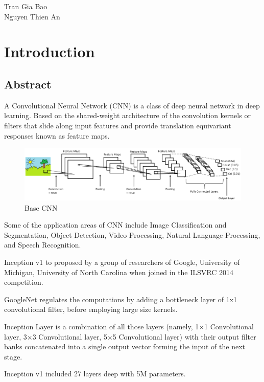 \documentclass[12pt]{report}
\begin{document}
	
	\begin{flushright}
		Tran Gia Bao \\
		Nguyen Thien An
	\end{flushright}
	
	\tableofcontents
	\listoffigures
	\chapter{Introduction}
	\section{Abstract}
	A Convolutional Neural Network (CNN) is a class of deep neural network in deep learning. Based on the shared-weight architecture of the convolution kernels or filters that slide along input features and provide translation equivariant responses known as feature maps.
	\begin{figure}[h]
		\begin{center}
			\includegraphics[width=\textwidth]{CNN.png}\caption{Base CNN}\label{fig:CNN}
		\end{center}
	\end{figure}

	Some of the application areas of CNN include Image Classification and Segmentation, Object Detection, Video Processing, Natural Language Processing, and Speech Recognition.
	
	Inception v1 to proposed by a group of researchers of Google, University of Michigan, University of North Carolina when joined in the ILSVRC 2014 competition. 
	
	GoogleNet regulates the computations by adding a bottleneck layer of 1x1 convolutional filter, before employing large size kernels.
	
	Inception Layer is a combination of all those layers (namely, 1×1 Convolutional layer, 3×3 Convolutional layer, 5×5 Convolutional layer) with their output filter banks concatenated into a single output vector forming the input of the next stage.
	
	Inception v1 included 27 layers deep with 5M parameters. \cite{ref1} 
	\newpage
\end{document}
